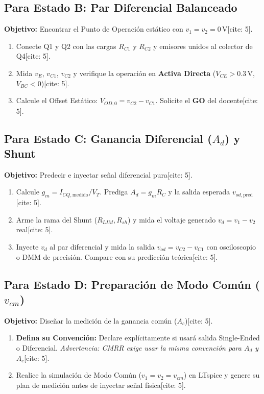 \documentclass[11pt, a4paper]{article}
\begin{document}
\subsection*{Para Estado B: Par Diferencial Balanceado}
\textbf{Objetivo:} Encontrar el Punto de Operación estático con $v_1 = v_2 = 0\,\text{V}$[cite: 5].
\begin{enumerate}
    \item Conecte Q1 y Q2 con las cargas $R_{C1}$ y $R_{C2}$ y emisores unidos al colector de Q4[cite: 5].
    \item Mida $v_E$, $v_{C1}$, $v_{C2}$ y verifique la operación en \textbf{Activa Directa} ($V_{CE} > 0.3\,\text{V}$, $V_{BC} < 0$)[cite: 5].
    \item Calcule el Offset Estático: $V_{OD,0} = v_{C2} - v_{C1}$. Solicite el \textbf{GO} del docente[cite: 5].
\end{enumerate}

\subsection*{Para Estado C: Ganancia Diferencial ($A_d$) y Shunt}
\textbf{Objetivo:} Predecir e inyectar señal diferencial pura[cite: 5].
\begin{enumerate}
    \item Calcule $g_m = I_{CQ,\text{medido}} / V_T$. Prediga $A_d = g_m R_C$ y la salida esperada $v_{od, \text{pred}}$[cite: 5].
    \item Arme la rama del Shunt ($R_{LIM}, R_{sh}$) y mida el voltaje generado $v_d = v_1 - v_2$ real[cite: 5].
    \item Inyecte $v_d$ al par diferencial y mida la salida $v_{od} = v_{C2} - v_{C1}$ con osciloscopio o DMM de precisión. Compare con su predicción teórica[cite: 5].
\end{enumerate}

\subsection*{Para Estado D: Preparación de Modo Común ($v_{cm}$)}
\textbf{Objetivo:} Diseñar la medición de la ganancia común ($A_c$)[cite: 5].
\begin{enumerate}
    \item \textbf{Defina su Convención:} Declare explícitamente si usará salida Single-Ended o Diferencial. \textit{Advertencia: CMRR exige usar la misma convención para $A_d$ y $A_c$}[cite: 5].
    \item Realice la simulación de Modo Común ($v_1 = v_2 = v_{cm}$) en LTspice y genere su plan de medición antes de inyectar señal física[cite: 5].
\end{enumerate}
\end{document}
